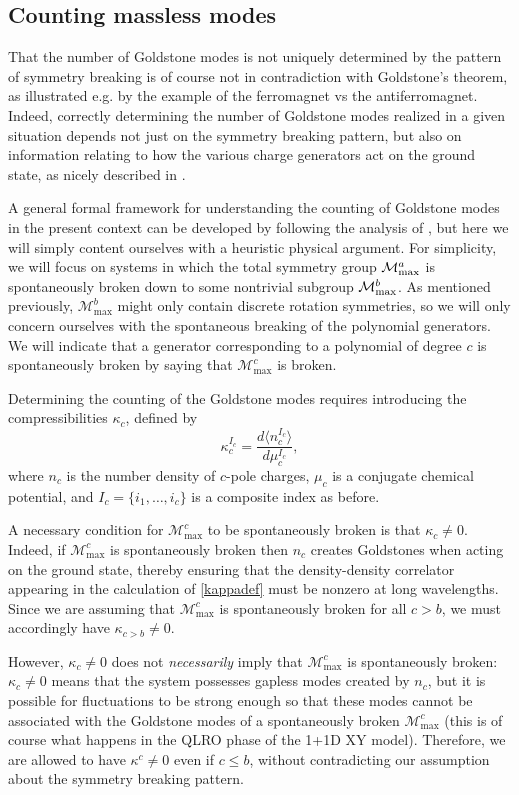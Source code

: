 \documentclass[prb,aps,twocolumn, amsfonts,amsmath,amssymb,nofootinbib,superscriptaddress]{revtex4-2}
\renewcommand{\max}{\text{max}}
\newcommand{\mmax}[1]{\mathcal{M}^{#1}_\max}
\newcommand\be            {\begin{equation}}
\newcommand\ee            {\end{equation}}
\newcommand{\mcm}{\mathcal{M}}
\begin{document}
\subsection{Counting massless modes} \label{sub:subgroup}

That the number of Goldstone modes is not uniquely determined by the pattern of symmetry breaking is of course not in contradiction with Goldstone's theorem, as illustrated e.g. by the example of the ferromagnet vs the antiferromagnet. Indeed, correctly determining the number of Goldstone modes realized in a given situation depends not just on the symmetry breaking pattern, but also on information relating to how the various charge generators act on the ground state, as nicely described in \cite{watanabe2013redundancies}.

A general formal framework for understanding the counting of Goldstone modes in the present context can be developed by following the analysis of \cite{watanabe2013redundancies}, but here we will simply content ourselves with a heuristic physical argument. For simplicity, we will focus on systems in which the total symmetry group $\mcm_{\rm max}^a$ is spontaneously broken down to some nontrivial subgroup $\mcm_{\rm max}^b$. As mentioned previously, $\mmax{b}$ might only contain discrete rotation symmetries, so we will only concern ourselves with the spontaneous breaking of the polynomial generators. We will indicate that a generator corresponding to a polynomial of degree $c$ is spontaneously broken by saying that $\mmax{c}$ is broken.

Determining the counting of the Goldstone modes requires introducing the compressibilities $\kappa_c$, defined by 
\be \label{kappadef} \kappa_c^{I_c} = \frac{d\langle n_c^{I_c}\rangle}{d\mu_c^{I_c}},\ee 
where $n_c$ is the number density of $c$-pole charges, $\mu_c$ is a conjugate chemical potential, and $I_c = \{i_1,\dots,i_c\}$ is a composite index as before.

A necessary condition for $\mmax c$ to be spontaneously broken is that $\kappa_c \neq 0$. Indeed, if $\mmax c$ is spontaneously broken then $n_c$ creates Goldstones when acting on the ground state, thereby ensuring that the density-density correlator appearing in the calculation of \eqref{kappadef} must be nonzero at long wavelengths. Since we are assuming that $\mmax c$ is spontaneously broken for all $c>b$, we must accordingly have $\kappa_{c>b} \neq 0$. 

However, $\kappa_c \neq 0$ does not {\it necessarily} imply that $\mmax c$ is spontaneously broken: $\kappa_c\neq 0$ means that the system possesses gapless modes created by $n_c$, but it is possible for fluctuations to be strong enough so that these modes cannot be associated with the Goldstone modes of a spontaneously broken $\mmax c$ (this is of course what happens in the QLRO phase of the 1+1D XY model). Therefore, we are allowed to have $\kappa^c \neq 0$ even if $c \leq b$, without contradicting our assumption about the symmetry breaking pattern. 
\end{document}

